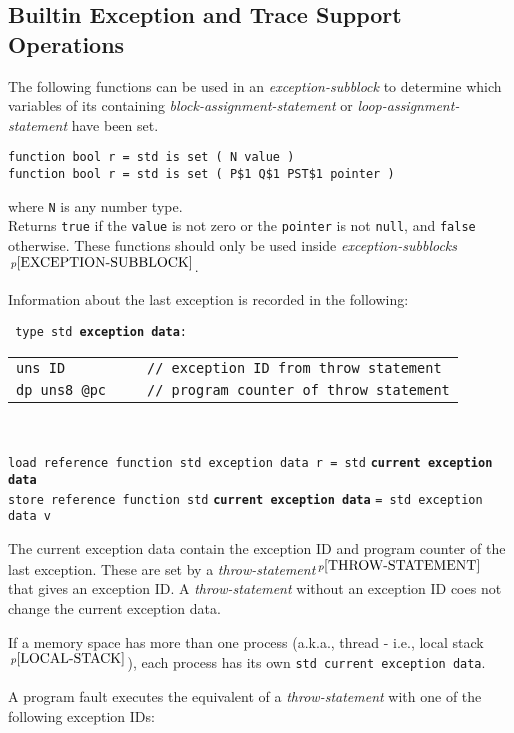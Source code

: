 \documentclass[12pt]{article}
\newcommand{\ttkey}[1]{{\tt \bfseries #1}}
\newcommand{\pagnote}[1]{$\,^{p\pageref{#1}}$}
\newenvironment{indpar}[1][0.3in]%
	{\begin{list}{}%
		     {\setlength{\itemsep}{0in}%
		      \setlength{\topsep}{0in}%
		      \setlength{\parsep}{1ex}%
		      \setlength{\labelwidth}{#1}%
		      \setlength{\leftmargin}{#1}%
		      \addtolength{\leftmargin}{\labelsep}}%
	 \item}%
	{\end{list}}
\begin{document}
\subsection{Builtin Exception and Trace Support Operations}
\label{BUILTIN-EXCEPTION-AND-TRACE-SUPPORT-OPERATIONS}

The following functions can be used in an {\em exception-subblock}
to determine which variables of its containing
{\em block-assignment-statement} or {\em loop-assignment-statement}
have been set.

{\tt function bool r = std is set ( N value )} \\
{\tt function bool r = std is set ( P\$1 Q\$1 PST\$1 pointer )}%
\label{IS-SET}
\begin{indpar}
where {\tt N} is any number type.
\\[1ex]
Returns {\tt true} if the {\tt value} is not zero or the {\tt pointer}
is not {\tt null}, and {\tt false} otherwise.
These functions should only be used inside
{\em exception-subblocks}\pagnote{EXCEPTION-SUBBLOCK}.
\end{indpar}

Information about the last exception is recorded in the following:

{\tt
type~std~\ttkey{exception data}: \\
\begin{tabular}[t]{@{~~~~~}l}
\tt uns~ID~~~~~~~~~~// exception ID from throw statement \\
\tt dp~uns8~@pc~~~~~// program counter of throw statement\\
\end{tabular} \\
}
{\tt load reference function std exception data r = std}
    \ttkey{current exception data} \\
{\tt store reference function std} \ttkey{current exception data}
    {\tt = std exception data v}
\begin{indpar}
The current exception data contain the exception ID and program counter
of the last exception.  These are set by
a {\em throw-statement}\pagnote{THROW-STATEMENT} that
gives an exception ID.   A {\em throw-statement} without an exception ID
coes not change the current exception data.
\end{indpar}

If a memory space has more than one process (a.k.a., thread - i.e., local
stack\pagnote{LOCAL-STACK}), each process has its own
{\tt std current exception data}.

A program fault executes the equivalent of a {\em throw-statement}
with one of the following exception IDs:
\end{document}
